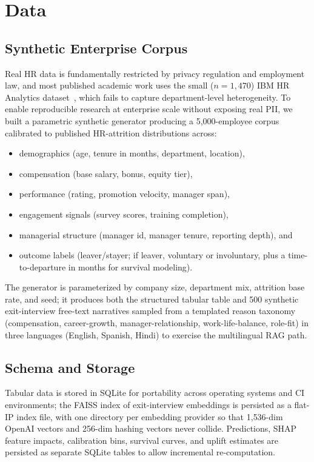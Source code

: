 \documentclass[conference]{IEEEtran}
\begin{document}
\section{Data}

\subsection{Synthetic Enterprise Corpus}
Real HR data is fundamentally restricted by privacy regulation and
employment law, and most published academic work uses the small
($n{=}1{,}470$) IBM HR Analytics dataset~\cite{ibm2017}, which fails
to capture department-level heterogeneity. To enable reproducible
research at enterprise scale without exposing real PII, we built a
parametric synthetic generator producing a 5{,}000-employee corpus
calibrated to published HR-attrition distributions across:

\begin{itemize}
\item demographics (age, tenure in months, department, location),
\item compensation (base salary, bonus, equity tier),
\item performance (rating, promotion velocity, manager span),
\item engagement signals (survey scores, training completion),
\item managerial structure (manager id, manager tenure, reporting
depth), and
\item outcome labels (leaver/stayer; if leaver, voluntary or
involuntary, plus a time-to-departure in months for survival
modeling).
\end{itemize}

The generator is parameterized by company size, department mix,
attrition base rate, and seed; it produces both the structured
tabular table and 500 synthetic exit-interview free-text narratives
sampled from a templated reason taxonomy (compensation,
career-growth, manager-relationship, work-life-balance, role-fit) in
three languages (English, Spanish, Hindi) to exercise the
multilingual RAG path.

\subsection{Schema and Storage}
Tabular data is stored in SQLite for portability across operating
systems and CI environments; the FAISS index of exit-interview
embeddings is persisted as a flat-IP index file, with one directory
per embedding provider so that 1{,}536-dim OpenAI vectors and
256-dim hashing vectors never collide. Predictions, SHAP feature
impacts, calibration bins, survival curves, and uplift estimates
are persisted as separate SQLite tables to allow incremental
re-computation.
\end{document}
